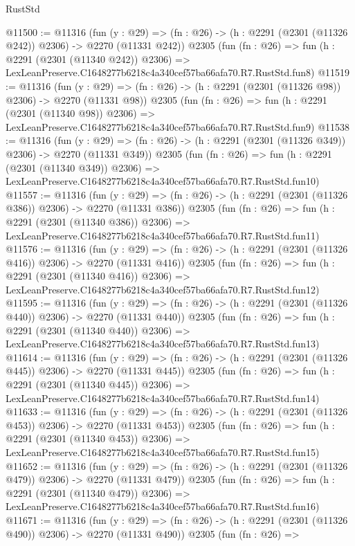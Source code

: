 \begin{lexlean}{RustStd}
\begin{coremodule}
@11500 := @11316
    (fun (y : @29) => (fn : @26) -> (h : @2291 (@2301 (@11326 @242)) @2306) -> @2270 (@11331 @242))
    @2305
    (fun (fn : @26) =>
    fun (h : @2291 (@2301 (@11340 @242)) @2306) =>
    LexLeanPreserve.C1648277b6218c4a340cef57ba66afa70.R7.RustStd.fun8)
@11519 := @11316
    (fun (y : @29) => (fn : @26) -> (h : @2291 (@2301 (@11326 @98)) @2306) -> @2270 (@11331 @98))
    @2305
    (fun (fn : @26) =>
    fun (h : @2291 (@2301 (@11340 @98)) @2306) =>
    LexLeanPreserve.C1648277b6218c4a340cef57ba66afa70.R7.RustStd.fun9)
@11538 := @11316
    (fun (y : @29) => (fn : @26) -> (h : @2291 (@2301 (@11326 @349)) @2306) -> @2270 (@11331 @349))
    @2305
    (fun (fn : @26) =>
    fun (h : @2291 (@2301 (@11340 @349)) @2306) =>
    LexLeanPreserve.C1648277b6218c4a340cef57ba66afa70.R7.RustStd.fun10)
@11557 := @11316
    (fun (y : @29) => (fn : @26) -> (h : @2291 (@2301 (@11326 @386)) @2306) -> @2270 (@11331 @386))
    @2305
    (fun (fn : @26) =>
    fun (h : @2291 (@2301 (@11340 @386)) @2306) =>
    LexLeanPreserve.C1648277b6218c4a340cef57ba66afa70.R7.RustStd.fun11)
@11576 := @11316
    (fun (y : @29) => (fn : @26) -> (h : @2291 (@2301 (@11326 @416)) @2306) -> @2270 (@11331 @416))
    @2305
    (fun (fn : @26) =>
    fun (h : @2291 (@2301 (@11340 @416)) @2306) =>
    LexLeanPreserve.C1648277b6218c4a340cef57ba66afa70.R7.RustStd.fun12)
@11595 := @11316
    (fun (y : @29) => (fn : @26) -> (h : @2291 (@2301 (@11326 @440)) @2306) -> @2270 (@11331 @440))
    @2305
    (fun (fn : @26) =>
    fun (h : @2291 (@2301 (@11340 @440)) @2306) =>
    LexLeanPreserve.C1648277b6218c4a340cef57ba66afa70.R7.RustStd.fun13)
@11614 := @11316
    (fun (y : @29) => (fn : @26) -> (h : @2291 (@2301 (@11326 @445)) @2306) -> @2270 (@11331 @445))
    @2305
    (fun (fn : @26) =>
    fun (h : @2291 (@2301 (@11340 @445)) @2306) =>
    LexLeanPreserve.C1648277b6218c4a340cef57ba66afa70.R7.RustStd.fun14)
@11633 := @11316
    (fun (y : @29) => (fn : @26) -> (h : @2291 (@2301 (@11326 @453)) @2306) -> @2270 (@11331 @453))
    @2305
    (fun (fn : @26) =>
    fun (h : @2291 (@2301 (@11340 @453)) @2306) =>
    LexLeanPreserve.C1648277b6218c4a340cef57ba66afa70.R7.RustStd.fun15)
@11652 := @11316
    (fun (y : @29) => (fn : @26) -> (h : @2291 (@2301 (@11326 @479)) @2306) -> @2270 (@11331 @479))
    @2305
    (fun (fn : @26) =>
    fun (h : @2291 (@2301 (@11340 @479)) @2306) =>
    LexLeanPreserve.C1648277b6218c4a340cef57ba66afa70.R7.RustStd.fun16)
@11671 := @11316
    (fun (y : @29) => (fn : @26) -> (h : @2291 (@2301 (@11326 @490)) @2306) -> @2270 (@11331 @490))
    @2305
    (fun (fn : @26) =>

\end{coremodule}
\end{lexlean}
